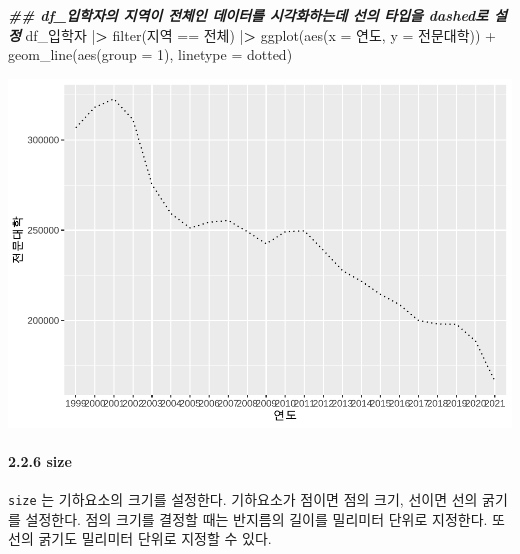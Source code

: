 \documentclass[
]{article}
\newenvironment{Shaded}{\begin{snugshade}}{\end{snugshade}}
\newcommand{\AttributeTok}[1]{\textcolor[rgb]{0.77,0.63,0.00}{#1}}
\newcommand{\DecValTok}[1]{\textcolor[rgb]{0.00,0.00,0.81}{#1}}
\newcommand{\DocumentationTok}[1]{\textcolor[rgb]{0.56,0.35,0.01}{\textbf{\textit{#1}}}}
\newcommand{\ErrorTok}[1]{\textcolor[rgb]{0.64,0.00,0.00}{\textbf{#1}}}
\newcommand{\FunctionTok}[1]{\textcolor[rgb]{0.00,0.00,0.00}{#1}}
\newcommand{\NormalTok}[1]{#1}
\newcommand{\SpecialCharTok}[1]{\textcolor[rgb]{0.00,0.00,0.00}{#1}}
\newcommand{\StringTok}[1]{\textcolor[rgb]{0.31,0.60,0.02}{#1}}
\begin{document}
\begin{Shaded}
\begin{Highlighting}[]
\DocumentationTok{\#\# df\_입학자의 지역이 \textquotesingle{}전체\textquotesingle{}인 데이터를 시각화하는데 선의 타입을 \textquotesingle{}dashed\textquotesingle{}로 설정}
\NormalTok{df\_입학자 }\SpecialCharTok{|}\ErrorTok{\textgreater{}} \FunctionTok{filter}\NormalTok{(지역 }\SpecialCharTok{==} \StringTok{\textquotesingle{}전체\textquotesingle{}}\NormalTok{) }\SpecialCharTok{|}\ErrorTok{\textgreater{}}
  \FunctionTok{ggplot}\NormalTok{(}\FunctionTok{aes}\NormalTok{(}\AttributeTok{x =}\NormalTok{ 연도, }\AttributeTok{y =}\NormalTok{ 전문대학)) }\SpecialCharTok{+}
  \FunctionTok{geom\_line}\NormalTok{(}\FunctionTok{aes}\NormalTok{(}\AttributeTok{group =} \DecValTok{1}\NormalTok{), }\AttributeTok{linetype =} \StringTok{\textquotesingle{}dotted\textquotesingle{}}\NormalTok{)}
\end{Highlighting}
\end{Shaded}

\includegraphics{chap3_files/figure-latex/unnamed-chunk-12-1.pdf}

\hypertarget{size}{%
\paragraph{2.2.6 size}\label{size}}

\texttt{size} 는 기하요소의 크기를 설정한다. 기하요소가 점이면 점의 크기, 선이면 선의 굵기를 설정한다. 점의 크기를 결정할 때는 반지름의 길이를 밀리미터 단위로 지정한다. 또 선의 굵기도 밀리미터 단위로 지정할 수 있다.
\end{document}
